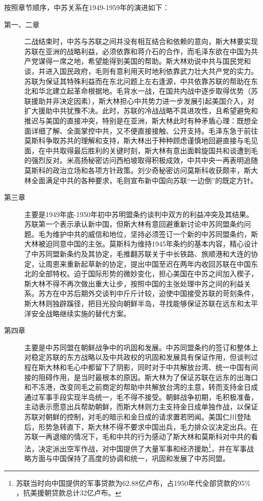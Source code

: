 按照章节顺序，中苏关系在1949-1959年的演进如下：
\begin{description}
    \item[第一、二章] 二战结束时，中苏与苏联之间并没有相互结合和依赖的意向，斯大林要实现苏联在亚洲的战略利益，必须依靠和蒋介石的合作，而毛泽东欲在中国为共产党谋得一席之地，希望能得到美国的帮助。斯大林劝说中共与国民党和谈，并进入国民政府，毛则有意利用天时地利依靠武力壮大共产党的实力。苏联为保证其特殊利益而在东北问题上左右逢源，中共依靠苏联的帮助在东北和华北建立起革命根据地。毛背水一战，在国共内战中逐步取得优势（苏联援助并非决定因素），斯大林担心中共势力进一步发展引起美国介入，对扩大援助中共犹豫不决。此时，苏联的冷战战略不具进攻性，且希望避免和推迟与美国的直接冲突，特别是在亚洲，斯大林此时有种矛盾心理：既想全面详细了解、全面掌控中共，又不便直接接触、公开支持。毛泽东急于前往莫斯科争取苏共的理解和支持，斯大林出于种种顾虑谨慎地回避直接与毛见面，在中共取得最后胜利的关键时刻，斯大林有意出面斡旋国共和谈遭到毛的强烈反对。米高扬秘密访问西柏坡取得积极成效，中共中央一再表明追随莫斯科的政治立场和各项方针政策。刘少奇秘密访问莫斯科收获颇丰，斯大林全面满足中共的各种要求，毛则宣布新中国向苏联“一边倒”的既定方针。
    \item[第三章] 主要是1949年底-1950年初中苏明盟条约谈判中双方的利益冲突及其结果。苏联第一个表示承认新中国，但斯大林有意回避重新讨论中苏同盟条约问题。毛为维护中共的威信和地位，坚持必须签订一个新的中苏同盟条约，斯大林被迫同意中国的主张。莫斯科为维持1945年条约的基本内容，精心设计了中苏同盟新条约及其协定，毛推翻苏联关于中长铁路、旅顺港和大连的协定，让周恩来重新起草新的协定，提出中国至迟在两年内收回苏联在中国东北的全部特权。迫于国际形势的微妙变化，担心美国在中苏之间加入楔子，斯大林不得不再次做出重大让步，按照中国的主张处理中苏之间的利益关系。苏方在中苏后期外交谈判中斤斤计较，迫使中国接受苏联的苛刻条件，斯大林则独辟蹊径，把目光投向朝鲜半岛，寻找能够保证苏联在远东和太平洋安全战略继续实施的替代方案。
    \item[第四章] 主要是中苏同盟在朝鲜战争中的巩固和发展。中苏同盟条约的签订和整体上对稳定苏联的东方战略以及中共政权的巩固和发展具有保证作用，但谈判过程在斯大林和毛心中都留下了阴影，同时对于中共解放台湾、统一中国有间接的阻碍作用，是当时最根本的原因。斯大林为了保证苏联在远东的出海口和不冻港，改变同毛之前商定的帮助中共解放台湾的主意，转而支持金日成通过军事手段实现半岛统一，毛不得不接受。朝鲜战争初期，毛积极准备，主动表示愿意出兵帮助朝鲜，而斯大林则力主支持金日成单独作战，以保证苏联对朝鲜的控制，对毛的暗示和金日成的请求置若罔闻。美国仁川登陆后，形势急转直下，斯大林不得不要求中国出兵，毛力排众议决定出兵。在苏联一再退缩的情况下，毛和中共的行为感动了斯大林和莫斯科对中共的看法，决定派出空军作战，对中国提供了大量军事和经济援助\footnote{苏联当时向中国提供的军事贷款为62.88亿卢布，占1950年代全部贷款的95\% ，抗美援朝贷款总计32亿卢布。}，并在军事战略方面与中国保持了高度的协调和统一，巩固和发展了中苏同盟。

\end{description}
